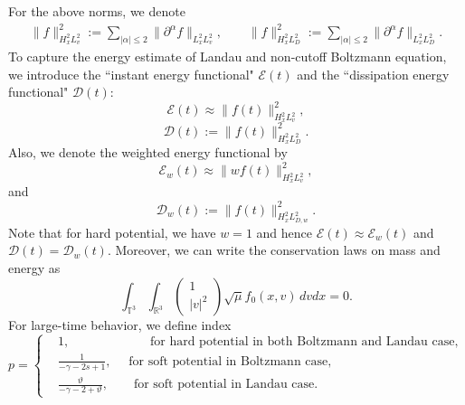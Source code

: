 \documentclass[reqno,a4paper]{amsart}
\numberwithin{equation}{section}
\newcommand{\1}{\mathbf{1}}
\newcommand{\R}{\mathbb{R}}
\renewcommand{\P}{\mathbf{P}}
\newcommand{\E}{\mathcal{E}}
\newcommand{\D}{\mathcal{D}}
\newcommand{\vt}{\vartheta}
\newcommand{\pa}{\partial}
\newcommand{\na}{\nabla}
\newcommand{\<}{\langle}
\renewcommand{\>}{\rangle}
\newcommand{\T}{\mathbb{T}}
\renewcommand{\P}{\mathbf{P}}
\begin{document}
For the above norms, we denote 
\begin{align*}
	\|f\|^2_{H^2_xL^2_v} := \sum_{|\alpha|\le 2}\|\pa^\alpha f\|_{L^2_xL^2_v},\qquad
	\|f\|^2_{H^2_xL^2_D} := \sum_{|\alpha|\le 2}\|\pa^\alpha f\|_{L^2_xL^2_D}.
\end{align*}
To capture the energy estimate of Landau and non-cutoff Boltzmann equation, we introduce the ``instant energy functional" $\E(t)$ and the ``dissipation energy functional" $\D(t)$:
\begin{equation}\label{defe}
	\E(t) \approx \|f(t)\|^2_{H^2_xL^2_v}, 
\end{equation}	
\begin{equation}\label{defd}
	\D(t) := \| f(t)\|_{H^2_xL^2_D}^2.
\end{equation}
Also, we denote the weighted energy functional by 
\begin{equation}\label{defew}
	\E_w(t) \approx \|wf(t)\|^2_{H^2_xL^2_v},
\end{equation} and
\begin{equation}\label{defdw}
\D_w(t) := \| f(t)\|_{H^2_xL^2_{D,w}}^2.
\end{equation}
Note that for hard potential, we have $w=1$ and hence $\E(t)\approx\E_w(t)$ and $\D(t)=\D_w(t)$. 
Moreover, we can write the conservation laws on mass and energy as 
\begin{equation}
	\label{conservatrion}
	\int_{\T^3}\int_{\R^3}\begin{pmatrix}
		1    \\
		|v|^2  
	\end{pmatrix}\sqrt{\mu}f_0(x,v)\,dvdx=0.
\end{equation}
For large-time behavior, we define index 
\begin{equation}\label{p}
	p = \left\{
	\begin{aligned}
		&1,\qquad\qquad\qquad \text{ for hard potential in both Boltzmann and Landau case, }\\
		&\frac{1}{-\gamma-2s+1},\quad\text{ for soft potential in Boltzmann case,}\\
		&\frac{\vt}{-\gamma-2+\vt},\qquad \text{for soft potential in Landau case.}
	\end{aligned}
	\right.
\end{equation}
\end{document}

